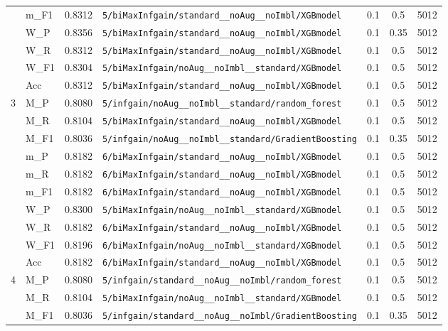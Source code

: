 \begin{table}[htbp]
\begin{tabular}{|c|l|c|>{\ttfamily\footnotesize}p{7.2cm}|c|c|c|}
 & m\_F1 & 0.8312 & \texttt{5/biMaxInfgain/standard\_\_noAug\_\_noImbl/XGBmodel} & 0.1 & 0.5  & 5012 \\ 
 & W\_P & 0.8356 & \texttt{5/biMaxInfgain/standard\_\_noAug\_\_noImbl/XGBmodel} & 0.1 & 0.35  & 5012 \\ 
 & W\_R & 0.8312 & \texttt{5/biMaxInfgain/standard\_\_noAug\_\_noImbl/XGBmodel} & 0.1 & 0.5  & 5012 \\ 
 & W\_F1 & 0.8304 & \texttt{5/biMaxInfgain/noAug\_\_noImbl\_\_standard/XGBmodel} & 0.1 & 0.5  & 5012 \\ 
 & Acc & 0.8312 & \texttt{5/biMaxInfgain/standard\_\_noAug\_\_noImbl/XGBmodel} & 0.1 & 0.5  & 5012 \\ 
\hline
\multirow{10}{*}{3} & M\_P & 0.8080 & \texttt{5/infgain/noAug\_\_noImbl\_\_standard/random\_forest} & 0.1 & 0.5  & 5012 \\ 
 & M\_R & 0.8104 & \texttt{5/biMaxInfgain/standard\_\_noAug\_\_noImbl/XGBmodel} & 0.1 & 0.5  & 5012 \\ 
 & M\_F1 & 0.8036 & \texttt{5/infgain/noAug\_\_noImbl\_\_standard/GradientBoosting} & 0.1 & 0.35  & 5012 \\ 
 & m\_P & 0.8182 & \texttt{6/biMaxInfgain/standard\_\_noAug\_\_noImbl/XGBmodel} & 0.1 & 0.5  & 5012 \\ 
 & m\_R & 0.8182 & \texttt{6/biMaxInfgain/standard\_\_noAug\_\_noImbl/XGBmodel} & 0.1 & 0.5  & 5012 \\ 
 & m\_F1 & 0.8182 & \texttt{6/biMaxInfgain/standard\_\_noAug\_\_noImbl/XGBmodel} & 0.1 & 0.5  & 5012 \\ 
 & W\_P & 0.8300 & \texttt{5/biMaxInfgain/noAug\_\_noImbl\_\_standard/XGBmodel} & 0.1 & 0.5  & 5012 \\ 
 & W\_R & 0.8182 & \texttt{6/biMaxInfgain/standard\_\_noAug\_\_noImbl/XGBmodel} & 0.1 & 0.5  & 5012 \\ 
 & W\_F1 & 0.8196 & \texttt{6/biMaxInfgain/noAug\_\_noImbl\_\_standard/XGBmodel} & 0.1 & 0.5  & 5012 \\ 
 & Acc & 0.8182 & \texttt{6/biMaxInfgain/standard\_\_noAug\_\_noImbl/XGBmodel} & 0.1 & 0.5  & 5012 \\ 
\hline
\multirow{10}{*}{4} & M\_P & 0.8080 & \texttt{5/infgain/standard\_\_noAug\_\_noImbl/random\_forest} & 0.1 & 0.5  & 5012 \\ 
 & M\_R & 0.8104 & \texttt{5/biMaxInfgain/noAug\_\_noImbl\_\_standard/XGBmodel} & 0.1 & 0.5  & 5012 \\ 
 & M\_F1 & 0.8036 & \texttt{5/infgain/standard\_\_noAug\_\_noImbl/GradientBoosting} & 0.1 & 0.35  & 5012 \\ 

\end{tabular}
\end{table}
